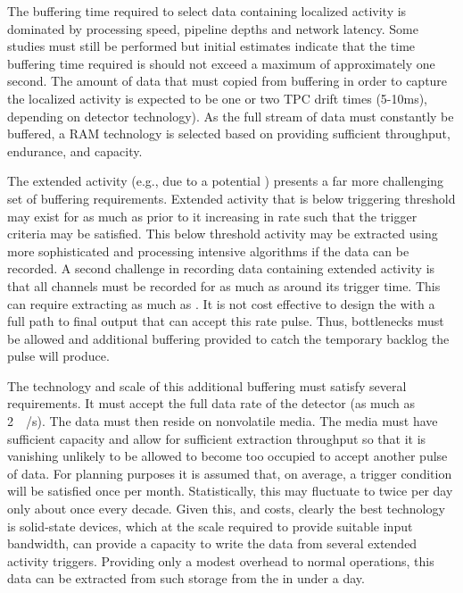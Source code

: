 The buffering time required to select data containing localized activity is dominated by processing speed, pipeline depths and network latency. 
Some studies must still be performed but initial estimates indicate that the time buffering time required is should not exceed a maximum of approximately one second. 
The amount of data that must copied from buffering in order to capture the localized activity is expected to be one or two TPC drift times (5-10\si{\milli\second}), depending on detector technology).
As the full stream of data must constantly be buffered, a RAM technology is selected based on providing sufficient throughput, endurance, and capacity.

The extended activity (e.g., due to a potential ) presents a far more challenging set of buffering requirements.  
Extended activity that is below triggering threshold may exist for as much as \snbpretime prior to it increasing in rate such that the trigger criteria may be satisfied. 
This below threshold activity may be extracted using more sophisticated and processing intensive algorithms if the data can be recorded. 
A second challenge in recording data containing extended activity is that all channels must be recorded for as much as \snbtime around its trigger time.
This can require extracting as much as \spsnbsize.
It is not cost effective to design the  with a full path to final output that can accept this rate pulse.
Thus, bottlenecks must be allowed and additional buffering provided to catch the temporary backlog the pulse will produce.

The technology and scale of this additional buffering must satisfy several requirements. 
It must accept the full data rate of the detector (as much as \SI{2}{\tera\byte/\second}). 
The data must then reside on nonvolatile media. 
The media must have sufficient capacity and allow for sufficient extraction throughput so that it is vanishing unlikely to be allowed to become too occupied to accept another pulse of data. 
For planning purposes it is assumed that, on average, a  trigger condition will be satisfied once per month. 
Statistically, this may fluctuate to twice per day only about once every decade.
Given this, and costs, clearly the  best technology is %
solid-state devices, which at the scale required to provide suitable input bandwidth, can provide a capacity to write the data from several extended activity triggers.
Providing only a modest overhead to normal operations, this data can be extracted from such storage from the  in under a day.

